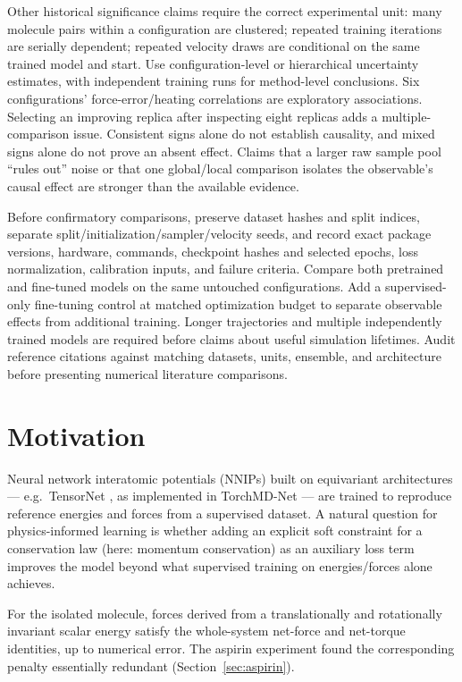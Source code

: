 \documentclass[11pt]{article}
\begin{document}
Other historical significance claims require the correct experimental
unit: many molecule pairs within a configuration are clustered; repeated
training iterations are serially dependent; repeated velocity draws are
conditional on the same trained model and start. Use configuration-level
or hierarchical uncertainty estimates, with independent training runs for
method-level conclusions. Six configurations' force-error/heating
correlations are exploratory associations. Selecting an improving replica
after inspecting eight replicas adds a multiple-comparison issue.
Consistent signs alone do not establish causality, and mixed signs alone
do not prove an absent effect. Claims that a larger raw sample pool
``rules out'' noise or that one global/local comparison isolates the
observable's causal effect are stronger than the available evidence.

Before confirmatory comparisons, preserve dataset hashes and split indices,
separate split/initialization/sampler/velocity seeds, and record exact
package versions, hardware, commands, checkpoint hashes and selected
epochs, loss normalization, calibration inputs, and failure criteria.
Compare both pretrained and fine-tuned models on the same untouched
configurations. Add a supervised-only fine-tuning control at matched
optimization budget to separate observable effects from additional
training. Longer trajectories and multiple independently trained models
are required before claims about useful simulation lifetimes. Audit
reference citations against matching datasets, units, ensemble, and
architecture before presenting numerical literature comparisons.

\section{Motivation}
\label{sec:motivation}

Neural network interatomic potentials (NNIPs) built on equivariant
architectures --- e.g.\ TensorNet \cite{tensornet}, as implemented in
TorchMD-Net \cite{torchmdnet2} --- are trained to reproduce reference
energies and forces from a supervised dataset. A natural question for
physics-informed learning is whether adding an explicit soft constraint for
a conservation law (here: momentum conservation) as an auxiliary loss term
improves the model beyond what supervised training on energies/forces alone
achieves.

For the isolated molecule, forces derived from a translationally and
rotationally invariant scalar energy satisfy the whole-system net-force
and net-torque identities, up to numerical error. The aspirin experiment
found the corresponding penalty essentially redundant
(Section~\ref{sec:aspirin}).
\end{document}
